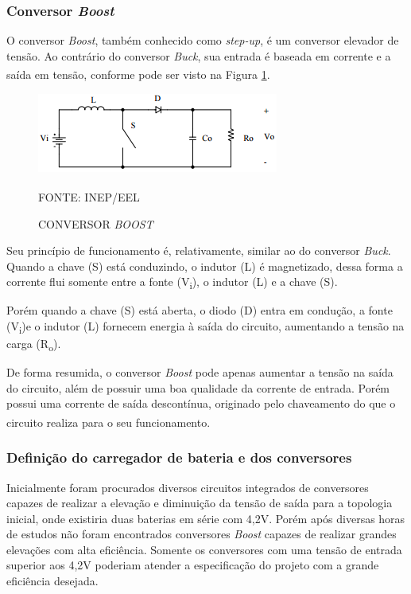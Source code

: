 \documentclass[
	12pt,				%
	openright,			%
	oneside,			%
	a4paper,			%
	english,			%
	french,				%
	spanish,			%
	brazil,				%
	oldfontcommands
	]{abntex2}
\begin{document}
\subsubsection[Conversor Boost]{Conversor \textit{Boost}}

	O conversor \textit{Boost}, também conhecido como \textit{step-up}, é um conversor elevador de tensão. Ao contrário do conversor \textit{Buck}, sua entrada é baseada em corrente e a saída em tensão, conforme pode ser visto na Figura \ref{Fig_boost}.\textsuperscript{\cite{inep}}

 	\begin{figure}[th]
		\caption{CONVERSOR \textit{BOOST}}
		\label{Fig_boost}
		\centering
		\includegraphics[width=0.5\linewidth]{./figs/boost}
			
		\begin{small}
			FONTE: INEP/EEL\textsuperscript{\cite{inep}}
		\end{small}		
	\end{figure}
	
	Seu princípio de funcionamento é, relativamente, similar ao do conversor \textit{Buck}. Quando a chave (S) está conduzindo, o indutor (L) é magnetizado, dessa forma a corrente flui somente entre a fonte (V\textsubscript{i}), o indutor (L) e a chave (S).
	
	Porém quando a chave (S) está aberta, o diodo (D) entra em condução, a fonte (V\textsubscript{i})e o indutor (L) fornecem energia à saída do circuito, aumentando a tensão na carga (R\textsubscript{o}).
	
	De forma resumida, o conversor \textit{Boost} pode apenas aumentar a tensão na saída do circuito, além de possuir uma boa qualidade da corrente de entrada. Porém possui uma corrente de saída descontínua, originado pelo chaveamento do que o circuito realiza para o seu funcionamento.\textsuperscript{\cite{inep}}
	
\subsubsection[Definição do carregador de bateria e dos conversores]{Definição do carregador de bateria e dos conversores}

	Inicialmente foram procurados diversos circuitos integrados de conversores capazes de realizar a elevação e diminuição da tensão de saída para a topologia inicial, onde existiria duas baterias em série com 4,2V. Porém após diversas horas de estudos não foram encontrados conversores \textit{Boost} capazes de realizar grandes elevações com alta eficiência. Somente os conversores com uma tensão de entrada superior aos 4,2V poderiam atender a especificação do projeto com a grande eficiência desejada.
	
\end{document}
